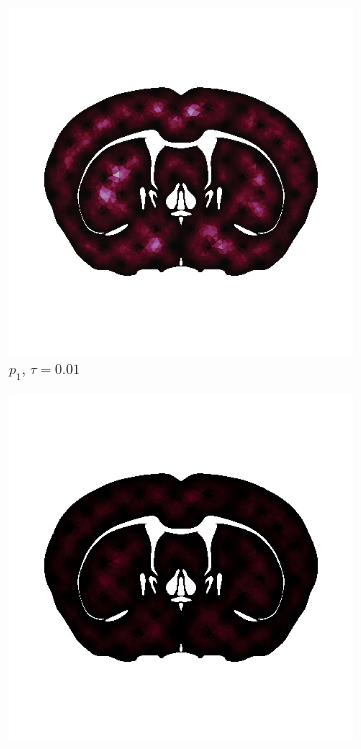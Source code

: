 \begin{figure}[h!]
  \centering
  \begin{subfigure}[b]{0.24\textwidth}
    \includegraphics[width=\textwidth,height=\textheight,keepaspectratio,height=\textheight,keepaspectratio]{figures/4_mpet/biomedical/time/eta4_p1_dt1.png}
    \caption{$p_1$, $\tau=0.01$}
  \end{subfigure}
  \begin{subfigure}[b]{0.24\textwidth}
    \includegraphics[width=\textwidth,height=\textheight,keepaspectratio,height=\textheight,keepaspectratio]{figures/4_mpet/biomedical/time/eta4_p1_dt2.png}

\end{subfigure}
\end{figure}
